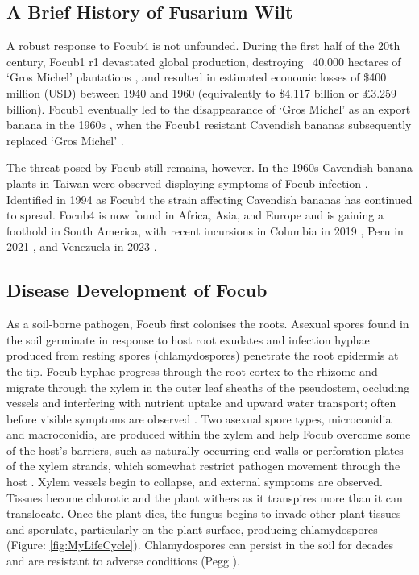 \subsection{A Brief History of Fusarium Wilt}
\label{chap1:focHistory}
A robust response to \ac{Focub4} is not unfounded. During the first half of the 20th century, \ac{Focub1} \ac{r1} devastated global production, destroying  ~40,000 hectares of ‘Gros Michel’ plantations \parencite{Agrios2005, Kema2021}, and resulted in estimated economic losses of \$400 million (USD) between 1940 and 1960 (equivalently to \$4.117 billion or £3.259 billion)\parencite{Ploetz2005}. \ac{Focub1} eventually led to the disappearance of ‘Gros Michel’ as an export banana in the 1960s \parencite{Molina2007}, when the \ac{Focub1} resistant Cavendish bananas subsequently replaced ‘Gros Michel’ \parencite{Ordonez2015}. 

The threat posed by \ac{Focub} still remains, however. In the 1960s Cavendish banana plants in Taiwan were observed displaying symptoms of \ac{Focub} infection \parencite{Agrios2005}. Identified in 1994 as \acl{Focub4} \parencite{Ploetz1994} the strain affecting Cavendish bananas has continued to spread. \Ac{Focub4} is now found in Africa, Asia, and Europe \parencite{Ploetz2015a, Thangavelu2019} and is gaining a foothold in South America, with recent incursions in Columbia in 2019 \parencite{Garcia-Bastidas2019}, Peru in 2021 \parencite{Acuna2022}, and Venezuela in 2023 \parencite{Herrera2023}.

\subsection{Disease Development of \acl{Focub}}

As a soil-borne pathogen, \ac{Focub} first colonises the roots. Asexual spores found in the soil germinate in response to host root exudates and infection hyphae produced from resting spores (chlamydospores) penetrate the root epidermis at the tip. \ac{Focub} hyphae progress through the root cortex to the rhizome and migrate through the xylem in the outer leaf sheaths of the pseudostem, occluding vessels and interfering with nutrient uptake and upward water transport; often before visible symptoms are observed \parencite{Li2017, Warman2018}. Two asexual spore types, microconidia and macroconidia, are produced within the xylem and help \ac{Focub} overcome some of the host’s barriers, such as naturally occurring end walls or perforation plates of the xylem strands, which somewhat restrict pathogen movement through the host \parencite{Dita2018}. Xylem vessels begin to collapse, and external symptoms are observed. Tissues become chlorotic and the plant withers as it transpires more than it can translocate. Once the plant dies, the fungus begins to invade other plant tissues and sporulate, particularly on the plant surface, producing chlamydospores (Figure: \ref{fig:MyLifeCycle}). Chlamydospores can persist in the soil for decades and are resistant to adverse conditions (Pegg ).  

